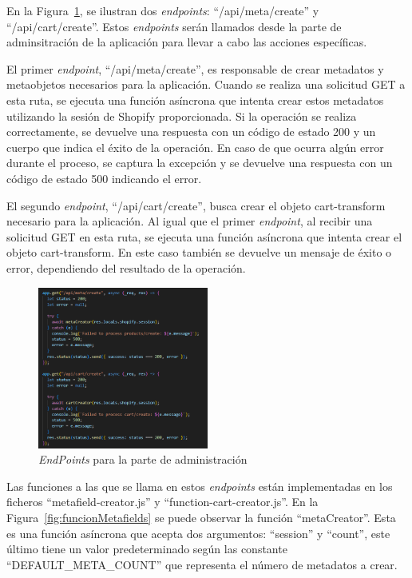 \documentclass[12pt]{article}
\begin{document}
En la Figura~\ref{fig:endpointsAdmin}, se ilustran dos \textit{endpoints}: ``/api/meta/create'' y ``/api/cart/create''. Estos \textit{endpoints} serán
llamados desde la parte de adminsitración de la aplicación para llevar a cabo las acciones específicas.

El primer \textit{endpoint}, ``/api/meta/create'', es responsable de crear metadatos y metaobjetos necesarios para la aplicación. Cuando se realiza
una solicitud GET a esta ruta, se ejecuta una función asíncrona que intenta crear estos metadatos utilizando la sesión de Shopify proporcionada.
Si la operación se realiza correctamente, se devuelve una respuesta con un código de estado 200 y un cuerpo que indica el éxito de la operación. 
En caso de que ocurra algún error durante el proceso, se captura la excepción y se devuelve una respuesta con un código 
de estado 500 indicando el error.

El segundo \textit{endpoint}, ``/api/cart/create'', busca crear el objeto cart-transform necesario para la aplicación. Al igual que el primer \textit{endpoint}, al recibir
una solicitud GET en esta ruta, se ejecuta una función asíncrona que intenta crear el objeto cart-transform. En este caso también se devuelve un 
mensaje de éxito o error, dependiendo del resultado de la operación.

\begin{figure}[ht]
    \centering
    \includegraphics[width=0.5\textwidth]{imagenes-back/EndpointsAdmin.png}
    \caption{\label{fig:endpointsAdmin} \textit{EndPoints} para la parte de administración }
    \vspace{\fill}
\end{figure}

Las funciones a las que se llama en estos \textit{endpoints} están implementadas en los ficheros ``metafield-creator.js'' y ``function-cart-creator.js''.
En la Figura~\ref{fig:funcionMetafields} se puede observar la función ``metaCreator''. Esta es una función asíncrona que acepta dos argumentos:
``session'' y ``count'', este último tiene un valor predeterminado según las constante ``DEFAULT\_META\_COUNT'' que representa el número de metadatos a crear.
\end{document}

